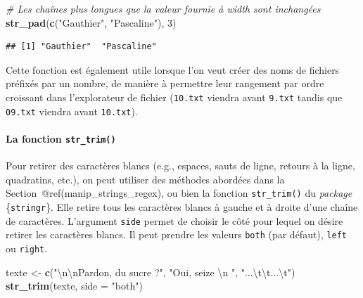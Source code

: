 \documentclass[
  11pt,
]{book}
\newenvironment{Shaded}{\begin{snugshade}}{\end{snugshade}}
\newcommand{\CharTok}[1]{\textcolor[rgb]{0.31,0.60,0.02}{#1}}
\newcommand{\CommentTok}[1]{\textcolor[rgb]{0.56,0.35,0.01}{\textit{#1}}}
\newcommand{\DataTypeTok}[1]{\textcolor[rgb]{0.13,0.29,0.53}{#1}}
\newcommand{\DecValTok}[1]{\textcolor[rgb]{0.00,0.00,0.81}{#1}}
\newcommand{\KeywordTok}[1]{\textcolor[rgb]{0.13,0.29,0.53}{\textbf{#1}}}
\newcommand{\NormalTok}[1]{#1}
\newcommand{\StringTok}[1]{\textcolor[rgb]{0.31,0.60,0.02}{#1}}
\numberwithin{equation}{section}
\numberwithin{countremarque}{section}
\begin{document}
\begin{Shaded}
\begin{Highlighting}[]
\CommentTok{\# Les chaînes plus longues que la valeur fournie à width sont inchangées}
\KeywordTok{str\_pad}\NormalTok{(}\KeywordTok{c}\NormalTok{(}\StringTok{"Gauthier"}\NormalTok{, }\StringTok{"Pascaline"}\NormalTok{), }\DecValTok{3}\NormalTok{)}
\end{Highlighting}
\end{Shaded}

\begin{lstlisting}
## [1] "Gauthier"  "Pascaline"
\end{lstlisting}

Cette fonction est également utile lorsque l'on veut créer des noms de fichiers préfixés par un nombre, de manière à permettre leur rangement par ordre croissant dans l'explorateur de fichier (\texttt{10.txt} viendra avant \texttt{9.txt} tandis que \texttt{09.txt} viendra avant \texttt{10.txt}).

\hypertarget{la-fonction-str_trim}{%
\paragraph{\texorpdfstring{La fonction \texttt{str\_trim()}}{La fonction str\_trim()}}\label{la-fonction-str_trim}}

Pour retirer des caractères blancs (e.g., espaces, sauts de ligne, retours à la ligne, quadratins, etc.), on peut utiliser des méthodes abordées dans la Section~@ref(manip\_strings\_regex), ou bien la fonction \texttt{str\_trim()} du \emph{package} \{\texttt{stringr}\}. Elle retire tous les caractères blancs à gauche et à droite d'une chaîne de caractères. L'argument \texttt{side} permet de choisir le côté pour lequel on désire retirer les caractères blancs. Il peut prendre les valeurs \texttt{both} (par défaut), \texttt{left} ou \texttt{right}.

\begin{Shaded}
\begin{Highlighting}[]
\NormalTok{texte \textless{}{-}}\StringTok{ }\KeywordTok{c}\NormalTok{(}\StringTok{"}\CharTok{\textbackslash{}n\textbackslash{}n}\StringTok{Pardon, du sucre ?"}\NormalTok{, }\StringTok{"Oui, seize   }\CharTok{\textbackslash{}n}\StringTok{ "}\NormalTok{, }\StringTok{"...}\CharTok{\textbackslash{}t\textbackslash{}t}\StringTok{...}\CharTok{\textbackslash{}t}\StringTok{"}\NormalTok{)}
\KeywordTok{str\_trim}\NormalTok{(texte, }\DataTypeTok{side =} \StringTok{"both"}\NormalTok{)}
\end{Highlighting}
\end{Shaded}
\end{document}
